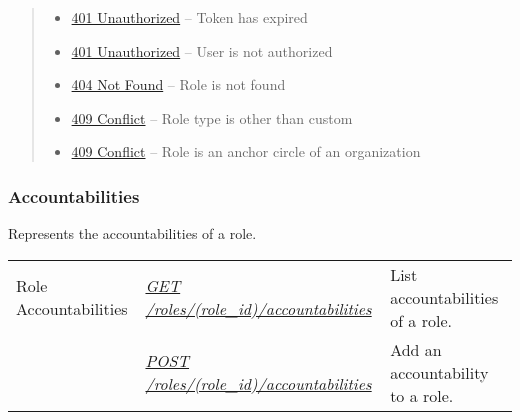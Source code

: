 \documentclass[letterpaper,10pt,english]{sphinxmanual}
\begin{document}
\begin{fulllineitems}
\begin{quote}
\begin{description}
\begin{itemize}
\item {} 
\href{http://www.w3.org/Protocols/rfc2616/rfc2616-sec10.html\#sec10.4.2}{401 Unauthorized} -- Token has expired

\item {} 
\href{http://www.w3.org/Protocols/rfc2616/rfc2616-sec10.html\#sec10.4.2}{401 Unauthorized} -- User is not authorized

\item {} 
\href{http://www.w3.org/Protocols/rfc2616/rfc2616-sec10.html\#sec10.4.5}{404 Not Found} -- Role is not found

\item {} 
\href{http://www.w3.org/Protocols/rfc2616/rfc2616-sec10.html\#sec10.4.10}{409 Conflict} -- Role type is other than custom

\item {} 
\href{http://www.w3.org/Protocols/rfc2616/rfc2616-sec10.html\#sec10.4.10}{409 Conflict} -- Role is an anchor circle of an organization

\end{itemize}

\end{description}\end{quote}

\end{fulllineitems}



\subsubsection{Accountabilities}
\label{\detokenize{resources/role:accountabilities}}
Represents the accountabilities of a role.

\noindent\begin{tabulary}{\linewidth}{|L|L|L|}
\hline
{}\relax &\relax &\relax \\
\hline
Role Accountabilities
&
{\hyperref[\detokenize{resources/role:get--roles-(role_id)-accountabilities}]{\emph{GET /roles/(role\_id)/accountabilities}}}
&
List accountabilities of a role.
\\
\hline&
{\hyperref[\detokenize{resources/role:post--roles-(role_id)-accountabilities}]{\emph{POST /roles/(role\_id)/accountabilities}}}
&
Add an accountability to a role.
\\
\hline\end{tabulary}
\end{document}
